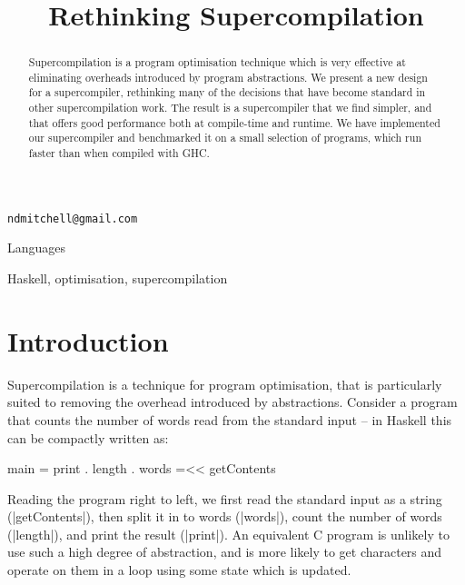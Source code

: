 \documentclass[draft]{sigplanconf}
\begin{document}

\titlebanner{\today{} - \currenttime{}}        %
\preprintfooter{}   %

\title{Rethinking Supercompilation}

           {\verb"ndmitchell@gmail.com"}

\maketitle

\begin{abstract}
Supercompilation is a program optimisation technique which is very effective at eliminating overheads introduced by program abstractions. We present a new design for a supercompiler, rethinking many of the decisions that have become standard in other supercompilation work. The result is a supercompiler that we find simpler, and that offers good performance both at compile-time and runtime. We have implemented our supercompiler and benchmarked it on a small selection of programs, which run faster than when compiled with GHC.
\end{abstract}


\terms
Languages

\keywords
Haskell, optimisation, supercompilation

\section{Introduction}
\label{sec:introduction}

Supercompilation is a technique for program optimisation, that is particularly suited to removing the overhead introduced by abstractions. Consider a program that counts the number of words read from the standard input -- in Haskell \cite{haskell} this can be compactly written as:

\begin{code}
main = print . length . words =<< getContents
\end{code}

Reading the program right to left, we first read the standard input as a string (|getContents|), then split it in to words (|words|), count the number of words (|length|), and print the result (|print|). An equivalent C program is unlikely to use such a high degree of abstraction, and is more likely to get characters and operate on them in a loop using some state which is updated.
\end{document}
